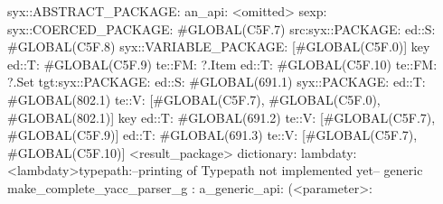             syx::ABSTRACT_PACKAGE:
                an_api: <omitted>
                sexp:
                    syx::COERCED_PACKAGE:
                        #GLOBAL(C5F.7)
                         src:syx::PACKAGE:
                                ed::S: #GLOBAL(C5F.8) syx::VARIABLE_PACKAGE: [#GLOBAL(C5F.0)] key
                                ed::T: #GLOBAL(C5F.9) te::FM: ?.Item
                                ed::T: #GLOBAL(C5F.10) te::FM: ?.Set
                        tgt:syx::PACKAGE:
                            ed::S: #GLOBAL(691.1)
                             syx::PACKAGE:
                             ed::T: #GLOBAL(802.1) te::V: [#GLOBAL(C5F.7), #GLOBAL(C5F.0), #GLOBAL(802.1)]
                             key
                            ed::T: #GLOBAL(691.2)
                             te::V:
                             [#GLOBAL(C5F.7), #GLOBAL(C5F.9)]
                            ed::T: #GLOBAL(691.3)
                             te::V:
                             [#GLOBAL(C5F.7), #GLOBAL(C5F.10)]
         <result_package>
dictionary:
lambdaty:
  <lambdaty>typepath:--printing of Typepath not implemented yet--
generic make_complete_yacc_parser_g
:
a_generic_api:
(<parameter>:
